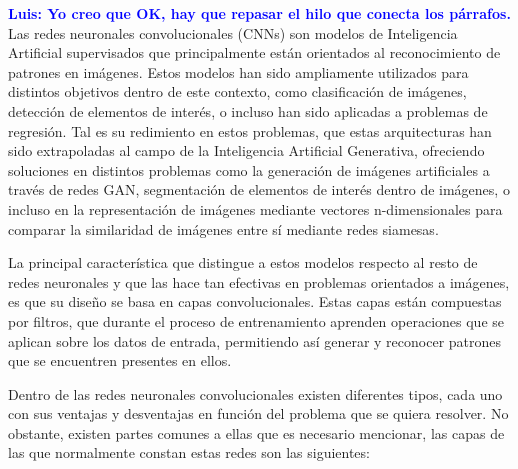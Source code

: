 \documentclass{uathesis-es}
\begin{document}
\textcolor{blue}{\textbf{Luis: Yo creo que OK, hay que repasar el hilo que conecta los párrafos.}}\\


Las redes neuronales convolucionales (CNNs) son modelos de Inteligencia Artificial supervisados que principalmente están orientados al reconocimiento de patrones en imágenes. Estos modelos han sido ampliamente utilizados para distintos objetivos dentro de este contexto, como clasificación de imágenes, detección de elementos de interés, o incluso han sido aplicadas a problemas de regresión. Tal es su redimiento en estos problemas, que estas arquitecturas han sido extrapoladas al campo de la Inteligencia Artificial Generativa, ofreciendo soluciones en distintos problemas como la generación de imágenes artificiales a través de redes GAN, segmentación de elementos de interés dentro de imágenes, o incluso en la representación de imágenes mediante vectores n-dimensionales para comparar la similaridad de imágenes entre sí mediante redes siamesas.

La principal característica que distingue a estos modelos respecto al resto de redes neuronales y que las hace tan efectivas en problemas orientados a imágenes, es que su diseño se basa en capas convolucionales. Estas capas están compuestas por filtros, que durante el proceso de entrenamiento aprenden operaciones que se aplican sobre los datos de entrada, permitiendo así generar y reconocer patrones que se encuentren presentes en ellos.

Dentro de las redes neuronales convolucionales existen diferentes tipos, cada uno con sus ventajas y desventajas en función del problema que se quiera resolver. No obstante, existen partes comunes a ellas que es necesario mencionar, las capas de las que normalmente constan estas redes son las siguientes:
\end{document}
